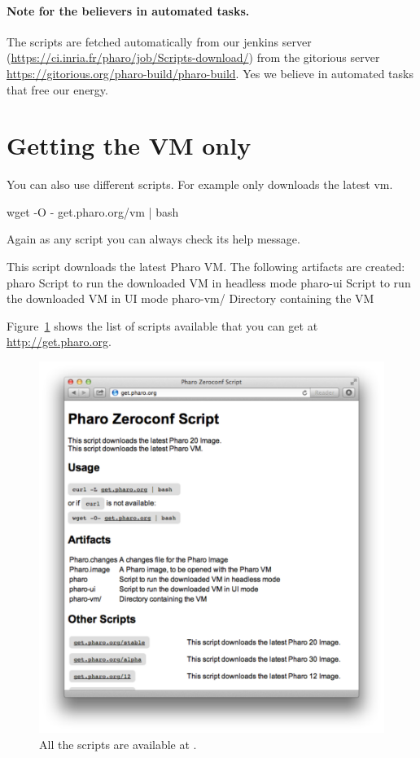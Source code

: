 \documentclass[a4paper,10pt,twoside]{book}
\begin{document}
\paragraph{Note for the believers in automated tasks.} 
The scripts are fetched automatically from our jenkins server (\url{https://ci.inria.fr/pharo/job/Scripts-download/}) from the gitorious server \mbox{\url{https://gitorious.org/pharo-build/pharo-build}.}
Yes we believe in automated tasks that free our energy. 

\section{Getting the VM only}
You can also use different scripts. For example  only downloads the latest vm.

\begin{code}{}
wget -O - get.pharo.org/vm | bash
\end{code}


Again as any script you can always check its help message.

\begin{code}{}
This script downloads the latest Pharo VM.
The following artifacts are created:
    pharo      Script to run the downloaded VM in headless mode
    pharo-ui   Script to run the downloaded VM in UI mode
    pharo-vm/  Directory containing the VM
\end{code}


Figure~\ref{fig:website} shows the list of scripts available that you can get at \mbox{\url{http://get.pharo.org}.}

\begin{figure}[!h]
	\centering
	\includegraphics[width=\textwidth]{zeroconfwebsite}
	\caption{All the scripts are available at .\label{fig:website}}
\end{figure}
\end{document}
